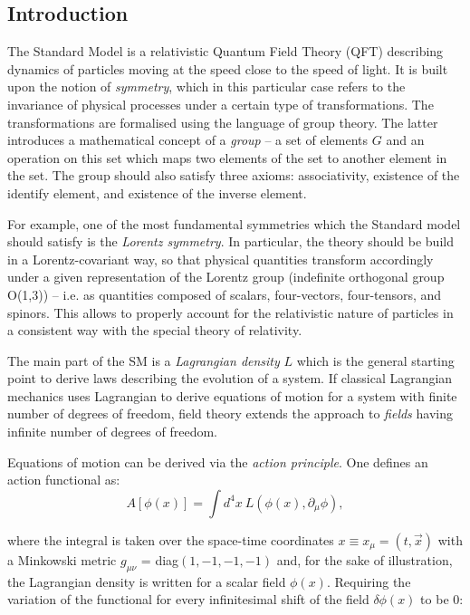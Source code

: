 \subsection{Introduction}\label{sec:lagr-intro}
The Standard Model is a relativistic Quantum Field Theory (QFT) describing dynamics of particles moving at the speed close to the speed of light. It is built upon the notion of \textit{symmetry}, which in this particular case refers to the invariance of physical processes under a certain type of transformations. The transformations are formalised using the language of group theory. The latter introduces a mathematical concept of a \textit{group} -- a set of elements $G$ and an operation on this set which maps two elements of the set to another element in the set. The group should also satisfy three axioms: associativity, existence of the identify element, and existence of the inverse element.

For example, one of the most fundamental symmetries which the Standard model should satisfy is the \textit{Lorentz symmetry}. In particular, the theory should be build in a Lorentz-covariant way, so that physical quantities transform accordingly under a given representation of the Lorentz group (indefinite orthogonal group O(1,3)) -- i.e. as quantities composed of scalars, four-vectors, four-tensors, and spinors. This allows to properly account for the relativistic nature of particles in a consistent way with the special theory of relativity. 

The main part of the SM is a \textit{Lagrangian density} $L$ which is the general starting point to derive laws describing the evolution of a system. If classical Lagrangian mechanics uses Lagrangian to derive equations of motion for a system with finite number of degrees of freedom, field theory extends the approach to \textit{fields} having infinite number of degrees of freedom.

Equations of motion can be derived via the \textit{action principle}. One defines an action functional as: 
\begin{equation}
    A[\phi(x)] = \int d^4x ~L(\phi(x), \partial_\mu\phi), 
\end{equation}

where the integral is taken over the space-time coordinates $x \equiv x_\mu = (t, \vec{x})$ with a Minkowski metric $g_{\mu\nu}$ = diag$(1, -1, -1, -1)$ and, for the sake of illustration, the Lagrangian density is written for a scalar field $\phi(x)$. Requiring the variation of the functional for every infinitesimal 
shift of the field $\delta\phi(x)$ to be 0:

